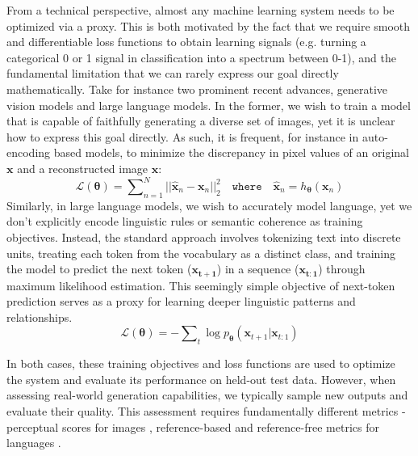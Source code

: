 \documentclass[manuscript,screen,authorversion,nonacm]{acmart}
\begin{document}
From a technical perspective, almost any machine learning system needs to be optimized via a proxy. This is both motivated by the fact that we require smooth and differentiable loss functions to obtain learning signals \cite{Murphy2012ProbMLBook} (e.g. turning a categorical 0 or 1 signal in classification into a spectrum between 0-1), and the fundamental limitation that we can rarely express our goal directly mathematically. Take for instance two prominent recent advances, generative vision models and large language models. In the former, we wish to train a model that is capable of faithfully generating a diverse set of images, yet it is unclear how to express this goal directly. As such, it is frequent, for instance in auto-encoding based models, to minimize the discrepancy in pixel values of an original $\mathbf{x}$ and a reconstructed image $\mathbf{\hat{x}}$:  
\begin{equation}
    \mathcal{L}(\mathbf{\theta}) = {\textstyle\sum\nolimits_{n=1}^{N}} ||\mathbf{\hat{x}}_n - \mathbf{x}_n||_2^2 \quad \mathtt{where} \quad \mathbf{\hat{x}}_n = h_{\mathbf{\theta}}(\mathbf{x}_n)
\end{equation}
Similarly, in large language models, we wish to accurately model language, yet we don't explicitly encode linguistic rules or semantic coherence as training objectives. 
Instead, the standard approach involves tokenizing text into discrete units, treating each token from the vocabulary as a distinct class, and training the model to predict the next token ($\mathbf{x_{t+1}}$) in a sequence ($\mathbf{x_{t:1}}$) through maximum likelihood estimation. 
This seemingly simple objective of next-token prediction serves as a proxy for learning deeper linguistic patterns and relationships.
\begin{equation}
    \mathcal{L}(\mathbf{\theta}) = - {\textstyle\sum\nolimits_t} \log p_{\mathbf{\theta}}(\mathbf{x}_{t+1}|\mathbf{x}_{t:1})
\end{equation}

In both cases, these training objectives and loss functions are used to optimize the system and evaluate its performance on held-out test data. 
However, when assessing real-world generation capabilities, we typically sample new outputs and evaluate their quality. This assessment requires fundamentally different metrics - perceptual scores for images \cite{kazmierczak2022study}, reference-based \cite{papineni2002bleu, lin2004rouge} and reference-free metrics for languages \cite{zhang2020bertscoreevaluatingtextgeneration}.
\end{document}
